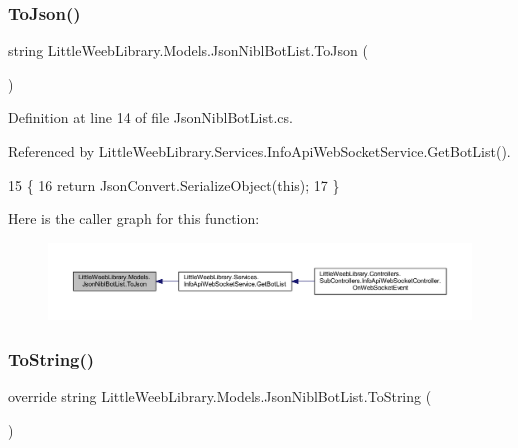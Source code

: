 \subsubsection{\texorpdfstring{To\+Json()}{ToJson()}}
{\footnotesize\ttfamily string Little\+Weeb\+Library.\+Models.\+Json\+Nibl\+Bot\+List.\+To\+Json (\begin{DoxyParamCaption}{ }\end{DoxyParamCaption})}



Definition at line 14 of file Json\+Nibl\+Bot\+List.\+cs.



Referenced by Little\+Weeb\+Library.\+Services.\+Info\+Api\+Web\+Socket\+Service.\+Get\+Bot\+List().


\begin{DoxyCode}
15         \{
16             \textcolor{keywordflow}{return} JsonConvert.SerializeObject(\textcolor{keyword}{this});
17         \}
\end{DoxyCode}
Here is the caller graph for this function\+:\nopagebreak
\begin{figure}[H]
\begin{center}
\leavevmode
\includegraphics[width=350pt]{class_little_weeb_library_1_1_models_1_1_json_nibl_bot_list_a852d40e99ff93888a16fdba1d45aee14_icgraph}
\end{center}
\end{figure}
\mbox{\label{class_little_weeb_library_1_1_models_1_1_json_nibl_bot_list_aff76def0d8bf7b2d2f3b985a0507d6a0}} 
\subsubsection{\texorpdfstring{To\+String()}{ToString()}}
{\footnotesize\ttfamily override string Little\+Weeb\+Library.\+Models.\+Json\+Nibl\+Bot\+List.\+To\+String (\begin{DoxyParamCaption}{ }\end{DoxyParamCaption})}



